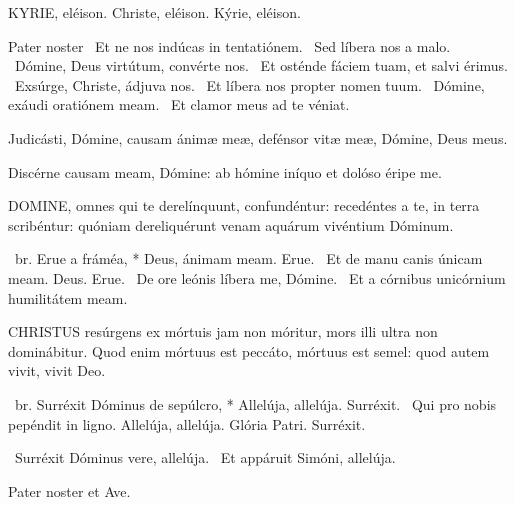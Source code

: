 
KYRIE, eléison. Christe, eléison. Kýrie, eléison.

Pater noster  \V\ Et ne nos indúcas in tentatiónem. \R\ Sed líbera nos a malo. \V\ Dómine, Deus virtútum, convérte nos. \R\ Et osténde fáciem tuam, et salvi érimus. \V\ Exsúrge, Christe, ádjuva nos. \R\ Et líbera nos propter nomen tuum. \V\ Dómine, exáudi oratiónem meam. \R\ Et clamor meus ad te véniat.




 Judicásti, Dómine, causam ánimæ meæ, defénsor vitæ meæ, Dómine, Deus meus.


 Discérne causam meam, Dómine: ab hómine iníquo et dolóso éripe me.


\lettrine[lines=2]{D}{OMINE}, omnes qui te derelínquunt, confundéntur: recedéntes a te, in terra scribéntur: quóniam dereliquérunt venam aquárum vivéntium Dóminum.

\R\ br. Erue a fráméa, * Deus, ánimam meam. Erue. \V\ Et de manu canis únicam meam. Deus. Erue. \V\ De ore leónis líbera me, Dómine. \R\ Et a córnibus unicórnium humilitátem meam.




\lettrine[lines=2]{C}{HRISTUS} resúrgens ex mórtuis jam non móritur, mors illi ultra non dominábitur. Quod enim mórtuus est peccáto, mórtuus est semel: quod autem vivit, vivit Deo.

\R\ br. Surréxit Dóminus de sepúlcro, * Allelúja, allelúja. Surréxit. \V\ Qui pro nobis pepéndit in ligno. Allelúja, allelúja. Glória Patri. Surréxit.

\V\ Surréxit Dóminus vere, allelúja. \R\ Et appáruit Simóni, allelúja.


\sectionornament


Pater noster et Ave.

